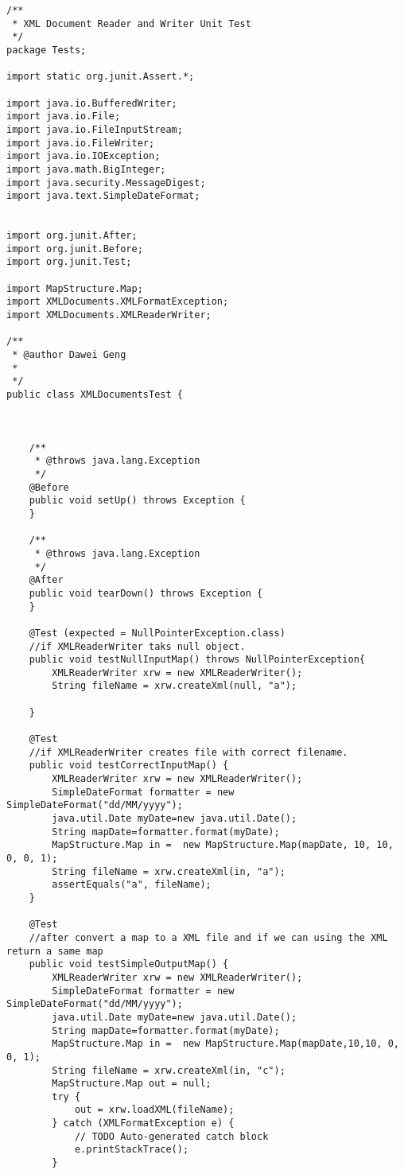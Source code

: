 \documentclass[12pt, a4paper]{report}
\begin{document}
\begin{lstlisting} 
/**
 * XML Document Reader and Writer Unit Test
 */
package Tests;

import static org.junit.Assert.*;

import java.io.BufferedWriter;
import java.io.File;
import java.io.FileInputStream;
import java.io.FileWriter;
import java.io.IOException;
import java.math.BigInteger;
import java.security.MessageDigest;
import java.text.SimpleDateFormat;


import org.junit.After;
import org.junit.Before;
import org.junit.Test;

import MapStructure.Map;
import XMLDocuments.XMLFormatException;
import XMLDocuments.XMLReaderWriter;

/**
 * @author Dawei Geng
 *
 */
public class XMLDocumentsTest {

	

	/**
	 * @throws java.lang.Exception
	 */
	@Before
	public void setUp() throws Exception {
	}

	/**
	 * @throws java.lang.Exception
	 */
	@After
	public void tearDown() throws Exception {
	}

	@Test (expected = NullPointerException.class)
	//if XMLReaderWriter taks null object.
	public void testNullInputMap() throws NullPointerException{
		XMLReaderWriter xrw = new XMLReaderWriter();
		String fileName = xrw.createXml(null, "a");
		
	}
	
	@Test
	//if XMLReaderWriter creates file with correct filename.
	public void testCorrectInputMap() {
		XMLReaderWriter xrw = new XMLReaderWriter();
		SimpleDateFormat formatter = new SimpleDateFormat("dd/MM/yyyy");  
	   	java.util.Date myDate=new java.util.Date();
	   	String mapDate=formatter.format(myDate); 
	   	MapStructure.Map in =  new MapStructure.Map(mapDate, 10, 10, 0, 0, 1);
		String fileName = xrw.createXml(in, "a");
		assertEquals("a", fileName);
	}
	
	@Test
	//after convert a map to a XML file and if we can using the XML return a same map
	public void testSimpleOutputMap() {
		XMLReaderWriter xrw = new XMLReaderWriter();
		SimpleDateFormat formatter = new SimpleDateFormat("dd/MM/yyyy");  
	   	java.util.Date myDate=new java.util.Date();
	   	String mapDate=formatter.format(myDate); 
	   	MapStructure.Map in =  new MapStructure.Map(mapDate,10,10, 0, 0, 1);
		String fileName = xrw.createXml(in, "c");
		MapStructure.Map out = null;
		try {
			out = xrw.loadXML(fileName);
		} catch (XMLFormatException e) {
			// TODO Auto-generated catch block
			e.printStackTrace();
		}
		

\end{lstlisting}
\end{document}
